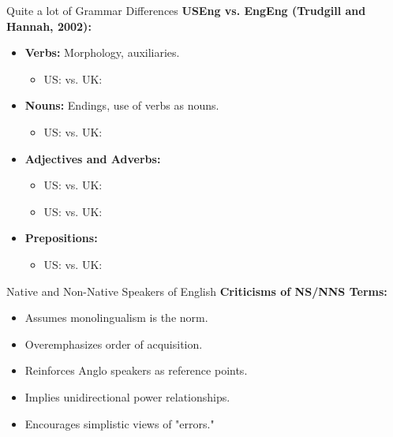 \documentclass{beamer}
\begin{document}
\begin{frame}{Quite a lot of Grammar Differences}
\textbf{USEng vs. EngEng (Trudgill and Hannah, 2002):}
\begin{itemize}
    \item \textbf{Verbs:} Morphology, auxiliaries.
    \begin{itemize}
        \item US:  vs. UK: 
    \end{itemize}
    \item \textbf{Nouns:} Endings, use of verbs as nouns.
    \begin{itemize}
        \item US:  vs. UK: 
    \end{itemize}
    \item \textbf{Adjectives and Adverbs:}
    \begin{itemize}
    \item US:  vs. UK: 
    \item US:  vs. UK: 
    \end{itemize}
    \item \textbf{Prepositions:}
    \begin{itemize}
        \item US:  vs. UK: 
    \end{itemize}
\end{itemize}
\end{frame}

\begin{frame}{Native and Non-Native Speakers of English}
\textbf{Criticisms of NS/NNS Terms:}
\begin{itemize}
    \item Assumes monolingualism is the norm.
    \item Overemphasizes order of acquisition.
    \item Reinforces Anglo speakers as reference points.
    \item Implies unidirectional power relationships.
    \item Encourages simplistic views of "errors."
\end{itemize}
\end{frame}
\end{document}
